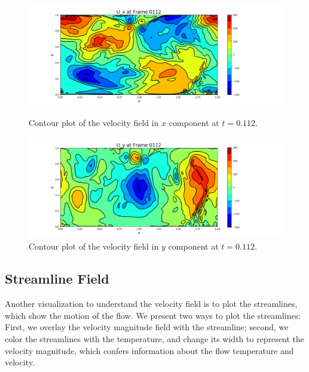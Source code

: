 \documentclass[11pt]{article} %
\begin{document}
\begin{figure}[h!]
\centering
\hspace*{-0.25in}
\includegraphics[width=1.2\textwidth]{velocity_x.png}
\caption{Contour plot of the velocity field in $x$ component at $t=0.112$.}
\hspace*{-0.25in}
\includegraphics[width=1.2\textwidth]{velocity_y.png}
\caption{Contour plot of the velocity field in $y$ component at $t=0.112$.}
\end{figure}
\newpage

\subsection{Streamline Field}
Another visualization to understand the velocity field is to plot the streamlines, which show the motion of the flow. We present two ways to plot the streamlines: First, we overlay the velocity magnitude field with the streamline; second, we color the streamlines with the temperature, and change its width to represent the velocity magnitude, which confers information about the flow temperature and velocity.
\end{document}
